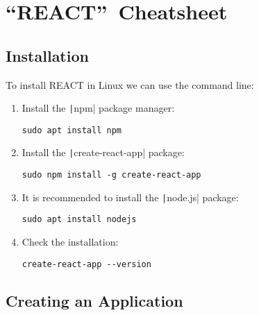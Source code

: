 \section{\textquotedblleft REACT\textquotedblright\ Cheatsheet}

\subsection{Installation}

To install REACT in Linux we can use the command line:
\begin{enumerate}
    \item Install the \texttt|npm| package manager:
    \begin{verbatim}
sudo apt install npm
    \end{verbatim}
    \item Install the \texttt|create-react-app| package:
    \begin{verbatim}
sudo npm install -g create-react-app
    \end{verbatim}
    \item It is recommended to install the \texttt|node.js| package:
    \begin{verbatim}
sudo apt install nodejs
    \end{verbatim}
    \item Check the installation:
    \begin{verbatim}
create-react-app --version
    \end{verbatim}
\end{enumerate}

\subsection{Creating an Application}

